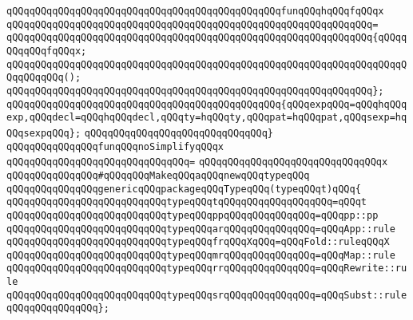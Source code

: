 \newline
\verb|qQQqqQQqqQQqqQQqqQQqqQQqqQQqqQQqqQQqqQQqqQQqqQQqfunqQQqhqQQqfqQQqx|\newline
\verb|qQQqqQQqqQQqqQQqqQQqqQQqqQQqqQQqqQQqqQQqqQQqqQQqqQQqqQQqqQQqqQQq=|\newline
\verb|qQQqqQQqqQQqqQQqqQQqqQQqqQQqqQQqqQQqqQQqqQQqqQQqqQQqqQQqqQQqqQQq{qQQqqQQqqQQqfqQQqx;|\newline
\verb|qQQqqQQqqQQqqQQqqQQqqQQqqQQqqQQqqQQqqQQqqQQqqQQqqQQqqQQqqQQqqQQqqQQqqQQqqQQqqQQq();|\newline
\verb|qQQqqQQqqQQqqQQqqQQqqQQqqQQqqQQqqQQqqQQqqQQqqQQqqQQqqQQqqQQqqQQq};|\newline
\newline
\verb|qQQqqQQqqQQqqQQqqQQqqQQqqQQqqQQqqQQqqQQqqQQqqQQq{qQQqexpqQQq=qQQqhqQQqexp,qQQqdecl=qQQqhqQQqdecl,qQQqty=hqQQqty,qQQqpat=hqQQqpat,qQQqsexp=hqQQqsexpqQQq};|\newline
\verb|qQQqqQQqqQQqqQQqqQQqqQQqqQQqqQQq}|\newline
\newline
\verb|qQQqqQQqqQQqqQQqfunqQQqnoSimplifyqQQqx|\newline
\verb|qQQqqQQqqQQqqQQqqQQqqQQqqQQqqQQq=|\newline
\verb|qQQqqQQqqQQqqQQqqQQqqQQqqQQqqQQqx|\newline
\newline
\verb|qQQqqQQqqQQqqQQq#qQQqqQQqMakeqQQqaqQQqnewqQQqtypeqQQq|\newline
\verb|qQQqqQQqqQQqqQQqgenericqQQqpackageqQQqTypeqQQq(typeqQQqt)qQQq{|\newline
\newline
\verb|qQQqqQQqqQQqqQQqqQQqqQQqqQQqtypeqQQqtqQQqqQQqqQQqqQQqqQQq=qQQqt|\newline
\verb|qQQqqQQqqQQqqQQqqQQqqQQqqQQqtypeqQQqppqQQqqQQqqQQqqQQq=qQQqpp::pp|\newline
\verb|qQQqqQQqqQQqqQQqqQQqqQQqqQQqtypeqQQqarqQQqqQQqqQQqqQQq=qQQqApp::rule|\newline
\verb|qQQqqQQqqQQqqQQqqQQqqQQqqQQqtypeqQQqfrqQQqXqQQq=qQQqFold::ruleqQQqX|\newline
\verb|qQQqqQQqqQQqqQQqqQQqqQQqqQQqtypeqQQqmrqQQqqQQqqQQqqQQq=qQQqMap::rule|\newline
\verb|qQQqqQQqqQQqqQQqqQQqqQQqqQQqtypeqQQqrrqQQqqQQqqQQqqQQq=qQQqRewrite::rule|\newline
\verb|qQQqqQQqqQQqqQQqqQQqqQQqqQQqtypeqQQqsrqQQqqQQqqQQqqQQq=qQQqSubst::rule|\newline
\verb|qQQqqQQqqQQqqQQq};|\newline
